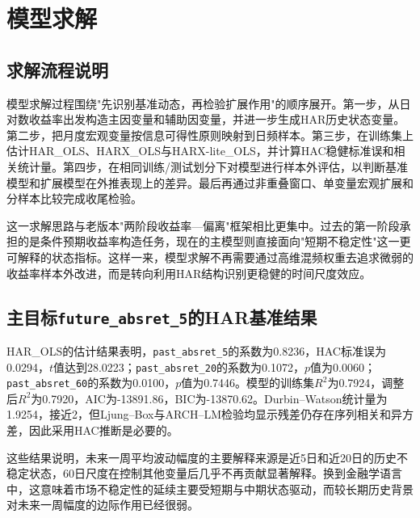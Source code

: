 
\section{模型求解}

\subsection{求解流程说明}

模型求解过程围绕"先识别基准动态，再检验扩展作用"的顺序展开。第一步，从日对数收益率出发构造主因变量和辅助因变量，并进一步生成HAR历史状态变量。第二步，把月度宏观变量按信息可得性原则映射到日频样本。第三步，在训练集上估计HAR\_OLS、HARX\_OLS与HARX-lite\_OLS，并计算HAC稳健标准误和相关统计量。第四步，在相同训练/测试划分下对模型进行样本外评估，以判断基准模型和扩展模型在外推表现上的差异。最后再通过非重叠窗口、单变量宏观扩展和分样本比较完成收尾检验。

这一求解思路与老版本"两阶段收益率—偏离"框架相比更集中。过去的第一阶段承担的是条件预期收益率构造任务，现在的主模型则直接面向"短期不稳定性"这一更可解释的状态指标。这样一来，模型求解不再需要通过高维混频权重去追求微弱的收益率样本外改进，而是转向利用HAR结构识别更稳健的时间尺度效应。

\subsection{主目标\texttt{future\_absret\_5}的HAR基准结果}

HAR\_OLS的估计结果表明，\texttt{past\_absret\_5}的系数为0.8236，HAC标准误为0.0294，\(t\)值达到28.0223；\texttt{past\_absret\_20}的系数为0.1072，\(p\)值为0.0060；\texttt{past\_absret\_60}的系数为0.0100，\(p\)值为0.7446。模型的训练集\(R^2\)为0.7924，调整后\(R^2\)为0.7920，AIC为-13891.86，BIC为-13870.62。Durbin--Watson统计量为1.9254，接近2，但Ljung--Box与ARCH--LM检验均显示残差仍存在序列相关和异方差，因此采用HAC推断是必要的。

这些结果说明，未来一周平均波动幅度的主要解释来源是近5日和近20日的历史不稳定状态，60日尺度在控制其他变量后几乎不再贡献显著解释。换到金融学语言中，这意味着市场不稳定性的延续主要受短期与中期状态驱动，而较长期历史背景对未来一周幅度的边际作用已经很弱。

